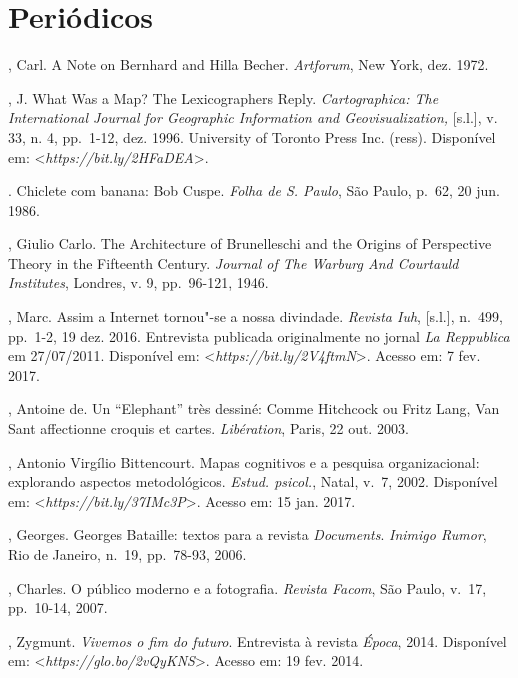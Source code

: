 \section{Periódicos}

\begin{Parskip}
, Carl. A Note on Bernhard and Hilla Becher. \emph{Artforum}, New
York, dez. 1972.

, J. What Was a Map? The Lexicographers Reply.
\emph{Cartographica: The International Journal for Geographic
Information and Geovisualization,} {[}s.l.{]}, v. 33, n. 4, pp.~1-12, dez.
1996. University of Toronto Press Inc. (ress). Disponível em:
\textless{}\emph{https://bit.ly/2HFaDEA}\textgreater{}. %

. Chiclete com banana: Bob Cuspe. \emph{Folha de S. Paulo}, São
Paulo, p.~62, 20 jun. 1986.

, Giulio Carlo. The Architecture of Brunelleschi and the Origins of
Perspective Theory in the Fifteenth Century. \emph{Journal of The
Warburg And Courtauld Institutes}, Londres, v. 9, pp.~96-121, 1946.

, Marc. Assim a Internet tornou"-se a nossa divindade.
\emph{Revista Iuh}, {[}s.l.{]}, n.~499, pp.~1-2, 19 dez. 2016.
Entrevista publicada originalmente no jornal \emph{La Reppublica} em
27/07/2011. Disponível em:
\textless{}\emph{https://bit.ly/2V4ftmN}\textgreater{}. Acesso em: 7 fev. 2017.

, Antoine de. Un ``Elephant'' très dessiné: Comme Hitchcock ou
Fritz Lang, Van Sant affectionne croquis et
cartes. \emph{Libération}, Paris, 22 out. 2003.

, Antonio Virgílio Bittencourt. Mapas cognitivos e a
pesquisa organizacional: explorando aspectos metodológicos. \emph{Estud. psicol.}, Natal, v.~7, 2002.
Disponível em:
\textless{}\emph{https://bit.ly/37IMc3P}\textgreater{}.
Acesso em: 15 jan. 2017.

, Georges. Georges Bataille: textos para a revista \emph{Documents}.
\emph{Inimigo Rumor}, Rio de Janeiro, n.~19, pp.~78-93, 2006.

, Charles. O público moderno e a fotografia. \emph{Revista
Facom}, São Paulo, v.~17, pp.~10-14, 2007.

, Zygmunt. \emph{Vivemos o fim do futuro}. Entrevista à revista
\emph{Época}, 2014. Disponível em:
\textless{}\emph{https://glo.bo/2vQyKNS}\textgreater{}.
Acesso em: 19 fev. 2014.


\end{Parskip}
